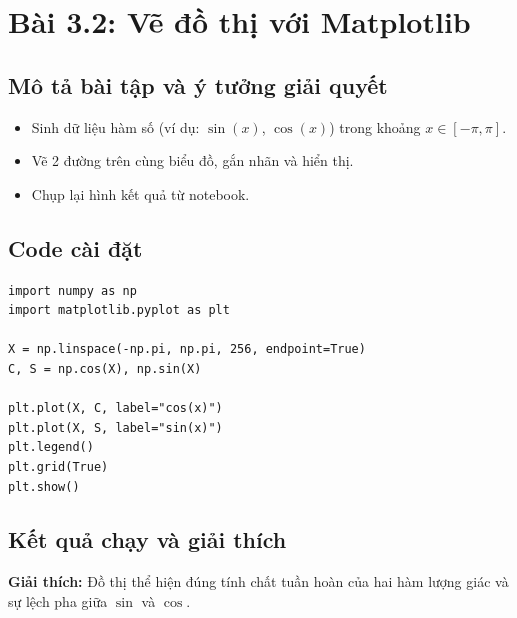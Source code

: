 \section{Bài 3.2: Vẽ đồ thị với Matplotlib}
\subsection{Mô tả bài tập và ý tưởng giải quyết}
\begin{itemize}
  \item Sinh dữ liệu hàm số (ví dụ: \(\sin(x)\), \(\cos(x)\)) trong khoảng \(x\in[-\pi,\pi]\).
  \item Vẽ 2 đường trên cùng biểu đồ, gắn nhãn và hiển thị.
  \item Chụp lại hình kết quả từ notebook.
\end{itemize}

\subsection{Code cài đặt}
\begin{lstlisting}
import numpy as np
import matplotlib.pyplot as plt

X = np.linspace(-np.pi, np.pi, 256, endpoint=True)
C, S = np.cos(X), np.sin(X)

plt.plot(X, C, label="cos(x)")
plt.plot(X, S, label="sin(x)")
plt.legend()
plt.grid(True)
plt.show()
\end{lstlisting}

\subsection{Kết quả chạy và giải thích}

\textbf{Giải thích:} Đồ thị thể hiện đúng tính chất tuần hoàn của hai hàm lượng giác và sự lệch pha giữa \(\sin\) và \(\cos\).

\clearpage

